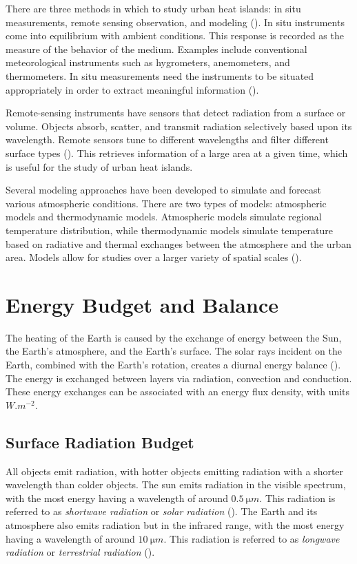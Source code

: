 	There are three methods in which to study urban heat islands:
	in situ measurements,
	remote sensing observation,
	and modeling (\cite{Bahi2020}).
	In situ instruments come into equilibrium with ambient conditions.
	This response is recorded as the measure of the behavior of the medium.
	Examples include conventional meteorological instruments such as hygrometers, anemometers, and thermometers.
	In situ measurements need the instruments to be situated appropriately in order to extract meaningful information (\cite{Oke2017urban}).
	
	Remote-sensing instruments have sensors that detect radiation from a surface or volume.
	Objects absorb, scatter, and transmit radiation selectively based upon its wavelength.
	Remote sensors tune to different wavelengths and filter different surface types (\cite{Oke2017urban}).
	This retrieves information of a large area at a given time, which is useful for the study of urban heat islands.
	
	Several modeling approaches have been developed to simulate and forecast various atmospheric conditions.
	There are two types of models: atmospheric models and thermodynamic models.
	Atmospheric models simulate regional temperature distribution, while thermodynamic models simulate temperature based on radiative and thermal exchanges between the atmosphere and the urban area.
	Models allow for studies over a larger variety of spatial scales (\cite{Bahi2020}).

\section{Energy Budget and Balance}

	The heating of the Earth is caused by the exchange of energy between the Sun, the Earth's atmosphere, and the Earth's surface.
	The solar rays incident on the Earth, combined with the Earth's rotation, creates a diurnal energy balance (\cite{Wallace2006}).
	The energy is exchanged between layers via radiation, convection and
	conduction.
	These energy exchanges can be associated with an energy flux density, with units $\si{W.m^{-2}}$.
	
	\subsection{Surface Radiation Budget}
		All objects emit radiation, with hotter objects emitting radiation with a shorter wavelength than colder objects.
		The sun emits radiation in the visible spectrum, with the most energy having a wavelength of around $\qty{0.5}{\micro m}$.
		This radiation is referred to as \textit{shortwave radiation} or \textit{solar radiation} (\cite{Oke2017urban}).
		The Earth and its atmosphere also emits radiation but in the infrared range, with the most energy having a wavelength of around $\qty{10}{\micro m}$.
		This radiation is referred to as \textit{longwave radiation} or \textit{terrestrial radiation} (\cite{Oke2017urban}).
		

